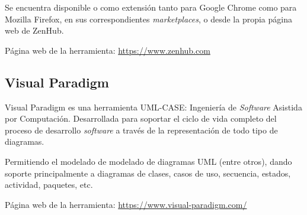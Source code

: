Se encuentra disponible o como extensión tanto para Google Chrome como para Mozilla Firefox, en sus correspondientes \textit{marketplaces}, o desde la propia página web de ZenHub.

Página web de la herramienta: \url{https://www.zenhub.com}\\

\subsection{Visual Paradigm}
Visual Paradigm es una herramienta UML-CASE: Ingeniería de \textit{Software} Asistida por Computación. Desarrollada para soportar el ciclo de vida completo del proceso de desarrollo \textit{software} a través de la representación de todo tipo de diagramas.

Permitiendo el modelado de modelado de diagramas UML (entre otros), dando soporte principalmente a diagramas de clases, casos de uso, secuencia, estados, actividad, paquetes, etc.

Página web de la herramienta: \url{https://www.visual-paradigm.com/}
